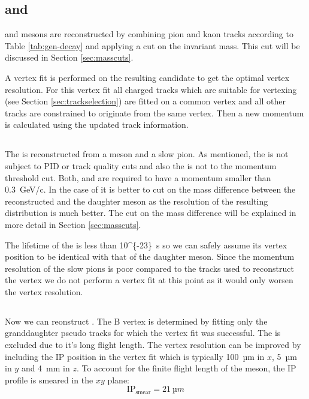 \documentclass[a4paper]{report}
\begin{document}
\subsection{\texorpdfstring{\PDz and \PDpm}{D0 and D+-}}
\PDz and \PDpm mesons are reconstructed by combining pion and kaon tracks
according to Table \ref{tab:gen-decay} and applying a cut on the invariant mass.
This cut will be discussed in Section \ref{sec:masscuts}.

A vertex fit is performed on the resulting \PD candidate to get the optimal
vertex resolution.  For this vertex fit all charged tracks which are suitable
for vertexing (see Section \ref{sec:trackselection}) are fitted on a common
vertex and all other tracks are constrained to originate from the same vertex.
Then a new \PD momentum is calculated using the updated track information.

\subsection{\texorpdfstring{\PDstpm}{D*+-}}
The \PDstpm is reconstructed from a \PD meson and a slow pion. As mentioned, the
\Pgppms is not subject to PID or track quality cuts and also the \Pgpzs is not
to the \Pgpz momentum threshold cut. Both, \Pgppms and \Pgpzs are required to
have a momentum smaller than \SI{0.3}{GeV/c}. In the case of \PDstpm it is
better to cut on the mass difference between the reconstructed \PDstpm and the
daughter \PD meson as the resolution of the resulting distribution is much
better. The cut on the mass difference will be explained in more detail in
Section \ref{sec:masscuts}.

The lifetime of the \PDstpm is less than \SI{10^{-23}}{s} so we can safely
assume its vertex position to be identical with that of the daughter \PD meson.
Since the momentum resolution of the slow pions is poor compared to the tracks
used to reconstruct the \PD vertex we do not perform a vertex fit at this point
as it would only worsen the vertex resolution.

\subsection{\texorpdfstring{\PBz}{B0}}

Now we can reonstruct \ddk. The B vertex is determined by fitting only the
granddaughter \PD pseudo tracks for which the vertex fit was successful. The
\PKzS is excluded due to it's long flight length. The vertex resolution can be
improved by including the IP position in the vertex fit which is typically
\SI{100}{µm} in $x$, \SI{5}{µm} in $y$ and \SI{4}{mm} in $z$. To account for the
finite flight length of the \PB meson, the IP profile is smeared in the
$xy$ plane:
\[ \text{IP}_{\text{smear}} = \SI{21}{µm} \]
\end{document}
